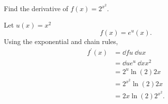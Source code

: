 \begin{example}
	Find the derivative of $f(x) = 2^{x^2}$.
\end{example}
Let $u(x) = x^2$
\begin{equation*}
	f(x) = e^u(x).
\end{equation*}
Using the exponential and chain rules,
\begin{align*}
	f^\prime(x) &= \dd{f}{u} \hspace{3pt} \dd{u}{x} \\
	&= \dd{}{u}e^u \hspace{3pt} \dd{}{x}x^2 \\
	&= 2^u \ln{(2)} 2x \\
	&= 2^{x^2} \ln{(2)} 2x \\
	&=  2x\ln{(2)}2^{x^2}.
\end{align*}
